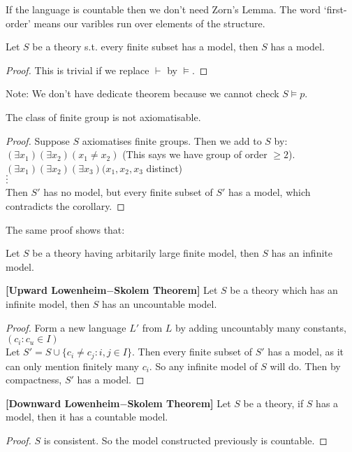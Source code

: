 \begin{remark} If the language is countable then we don't need Zorn's Lemma. The word `first-order' means our varibles run over elements of the structure.
\end{remark}
\begin{corollary} Let $S$ be a theory s.t. every finite subset has a model, then $S$ has a model.
\end{corollary}
\begin{proof} This is trivial if we replace $\vdash$ by $\models$.
\end{proof}
Note: We don't have dedicate theorem because we cannot check $S \models p$.\\
\begin{proposition} The class of finite group is not axiomatisable.
\end{proposition}
\begin{proof} Suppose $S$ axiomatises finite groups. Then we add to $S$ by:\\
$(\exists x_1)(\exists x_2)(x_1 \neq x_2)$ (This says we have group of order $\ge 2$).\\
$(\exists x_1)(\exists x_2)(\exists x_3)(x_1,x_2,x_3$ distinct)\\
$\cdot$\\
$\cdot$\\
$\cdot$\\
Then $S'$ has no model, but every finite subset of $S'$ has a model, which contradicts the corollary.
\end{proof}
The same proof shows that:
\begin{theorem} Let $S$ be a theory having arbitarily large finite model, then $S$ has an infinite model.
\end{theorem}
\begin{theorem}{\bf [Upward Lowenheim$-$Skolem Theorem]}\label{U;Upward} Let $S$ be a theory which has an infinite model, then $S$ has an uncountable model.
\end{theorem}
\begin{proof} Form a new language $L'$ from $L$ by adding uncountably many constants, $(c_i: c_u \in I)$\\
Let $S' = S \cup \{c_i \neq c_j: i,j \in I\}$. Then every finite subset of $S'$ has a model, as it can only mention finitely many $c_i$. So any infinite model of $S$ will do. Then by compactness, $S'$ has a model.
\end{proof}
\begin{theorem}{\bf [Downward Lowenheim$-$Skolem Theorem]}\label{D;Downward} Let $S$ be a theory, if $S$ has a model, then it has a countable model.
\end{theorem}
\begin{proof} $S$ is consistent. So the model constructed previously is countable.
\end{proof}
